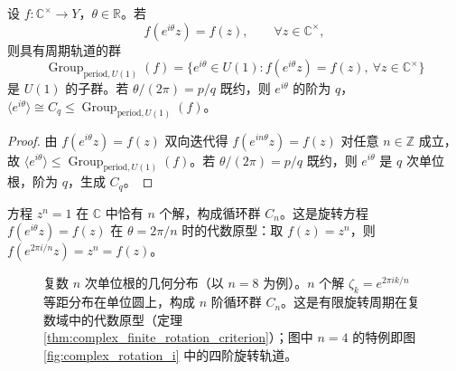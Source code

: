\begin{theorem}[复数旋转方程的具有周期轨道的群]\label{thm:rotation_equation_C}
设 $f:\mathbb{C}^\times\to Y$，$\theta\in\mathbb{R}$。若
\[
f(e^{i\theta}z)=f(z),\qquad \forall z\in\mathbb{C}^\times,
\]
则具有周期轨道的群
\[
\operatorname{Group}_{\mathrm{period},U(1)}(f)=\{e^{i\theta}\in U(1): f(e^{i\theta}z)=f(z),\ \forall z\in\mathbb{C}^\times\}
\]
是 $U(1)$ 的子群。若 $\theta/(2\pi)=p/q$ 既约，则 $e^{i\theta}$ 的阶为 $q$，$\langle e^{i\theta}\rangle\cong C_q\le\operatorname{Group}_{\mathrm{period},U(1)}(f)$。
\end{theorem}

\begin{proof}
由 $f(e^{i\theta}z)=f(z)$ 双向迭代得 $f(e^{in\theta}z)=f(z)$ 对任意 $n\in\mathbb{Z}$ 成立，故 $\langle e^{i\theta}\rangle\le\operatorname{Group}_{\mathrm{period},U(1)}(f)$。若 $\theta/(2\pi)=p/q$ 既约，则 $e^{i\theta}$ 是 $q$ 次单位根，阶为 $q$，生成 $C_q$。
\end{proof}

\begin{corollary}[单位根方程与有限旋转周期]\label{cor:unit_root_C}
方程 $z^n=1$ 在 $\mathbb{C}$ 中恰有 $n$ 个解，构成循环群 $C_n$。这是旋转方程 $f(e^{i\theta}z)=f(z)$ 在 $\theta=2\pi/n$ 时的代数原型：取 $f(z)=z^n$，则 $f(e^{2\pi i/n}z)=z^n=f(z)$。
\end{corollary}

\begin{figure}[htbp]
    \centering
    \caption{复数 $n$ 次单位根的几何分布（以 $n=8$ 为例）。$n$ 个解 $\zeta_k=e^{2\pi ik/n}$ 等距分布在单位圆上，构成 $n$ 阶循环群 $C_n$。这是有限旋转周期在复数域中的代数原型（定理 \ref{thm:complex_finite_rotation_criterion}）；图中 $n=4$ 的特例即图 \ref{fig:complex_rotation_i} 中的四阶旋转轨道。}
    \label{fig:unit_roots_Cn}
\end{figure}

